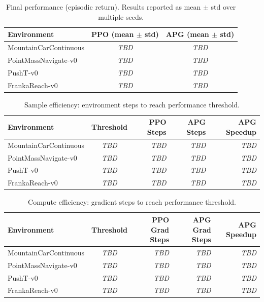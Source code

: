 \documentclass[11pt,a4paper]{article}
\newcommand{\tbd}{\textit{TBD}}
\begin{document}
\begin{table}[htbp]
  \centering
  \caption{Final performance (episodic return). Results reported as mean $\pm$ std over multiple seeds.}
  \label{tab:final_return}
  \begin{tabular}{@{}lcc@{}}
    \toprule
    \textbf{Environment} & \textbf{PPO (mean $\pm$ std)} & \textbf{APG (mean $\pm$ std)} \\
    \midrule
    MountainCarContinuous & \tbd & \tbd \\
    PointMassNavigate-v0 & \tbd & \tbd \\
    PushT-v0             & \tbd & \tbd \\
    FrankaReach-v0       & \tbd & \tbd \\
    \bottomrule
  \end{tabular}
\end{table}

\begin{table}[htbp]
  \centering
  \caption{Sample efficiency: environment steps to reach performance threshold.}
  \label{tab:sample_eff}
  \begin{tabular}{@{}lcrrr@{}}
    \toprule
    \textbf{Environment} & \textbf{Threshold} & \textbf{PPO Steps} & \textbf{APG Steps} & \textbf{APG Speedup} \\
    \midrule
    MountainCarContinuous & \tbd & \tbd & \tbd & \tbd \\
    PointMassNavigate-v0 & \tbd & \tbd & \tbd & \tbd \\
    PushT-v0             & \tbd & \tbd & \tbd & \tbd \\
    FrankaReach-v0       & \tbd & \tbd & \tbd & \tbd \\
    \bottomrule
  \end{tabular}
\end{table}

\begin{table}[htbp]
  \centering
  \caption{Compute efficiency: gradient steps to reach performance threshold.}
  \label{tab:grad_eff}
  \begin{tabular}{@{}lcrrr@{}}
    \toprule
    \textbf{Environment} & \textbf{Threshold} & \textbf{PPO Grad Steps} & \textbf{APG Grad Steps} & \textbf{APG Speedup} \\
    \midrule
    MountainCarContinuous & \tbd & \tbd & \tbd & \tbd \\
    PointMassNavigate-v0 & \tbd & \tbd & \tbd & \tbd \\
    PushT-v0             & \tbd & \tbd & \tbd & \tbd \\
    FrankaReach-v0       & \tbd & \tbd & \tbd & \tbd \\
    \bottomrule
  \end{tabular}
\end{table}
\end{document}
